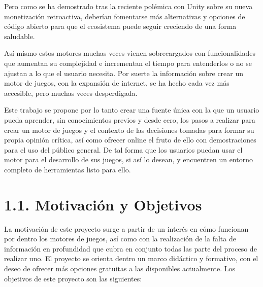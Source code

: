 Pero como se ha demostrado tras la reciente polémica con Unity sobre su nueva monetización retroactiva\cite{unity-polemic},
deberían fomentarse más alternativas y opciones de código abierto para que el ecosistema puede seguir creciendo de una forma
saludable.

Así mismo estos motores muchas veces vienen sobrecargados con funcionalidades que aumentan su complejidad e incrementan
el tiempo para entenderlos o no se ajustan a lo que el usuario necesita. Por suerte la información sobre crear un motor de juegos,
con la expansión de internet, se ha hecho cada vez más accesible, pero muchas veces desperdigada.

Este trabajo se propone por lo tanto crear una fuente única con la que un usuario pueda aprender, sin conocimientos previos
y desde cero, los pasos a realizar para crear un motor de juegos y el contexto de las decisiones tomadas para formar su
propia opinión crítica, así como ofrecer online el fruto de ello con demostraciones para el uso del público general.
De tal forma que los usuarios puedan usar el motor para el desarrollo de sus juegos, si
así lo desean, y encuentren un entorno completo de herramientas listo para ello.

\newpage

\section*{1.1. Motivación y Objetivos}\label{sec:motivation}

La motivación de este proyecto surge a partir de un interés en cómo funcionan por dentro los motores de juegos,
así como con la realización de la falta de información en profundidad que cubra en conjunto todas las parte del proceso
de realizar uno. El proyecto se orienta dentro un marco didáctico y formativo, con el deseo de ofrecer más opciones
gratuitas a las disponibles actualmente. Los objetivos de este proyecto son las siguientes:

